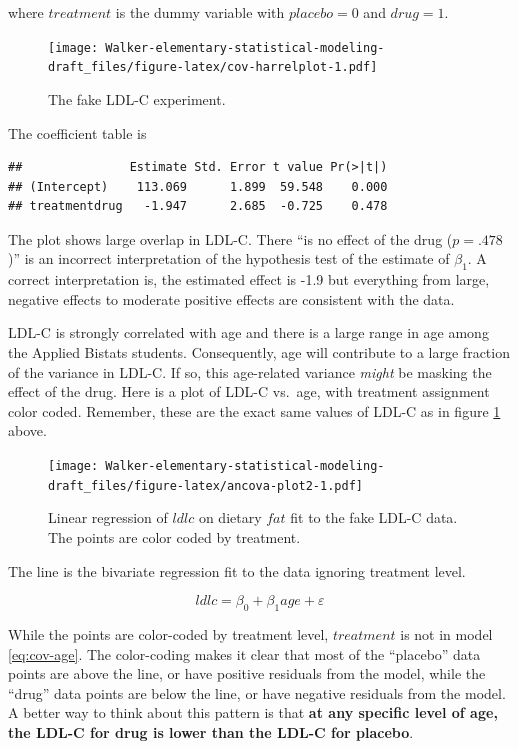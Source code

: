 \documentclass[]{book}
\begin{document}
where \(treatment\) is the dummy variable with \(placebo=0\) and \(drug=1\).

\begin{figure}
\centering
\texttt{[image: Walker-elementary-statistical-modeling-draft\_files/figure-latex/cov-harrelplot-1.pdf]}
\caption{\label{fig:cov-harrelplot}The fake LDL-C experiment.}
\end{figure}

The coefficient table is

\begin{verbatim}
##               Estimate Std. Error t value Pr(>|t|)
## (Intercept)    113.069      1.899  59.548    0.000
## treatmentdrug   -1.947      2.685  -0.725    0.478
\end{verbatim}

The plot shows large overlap in LDL-C. There ``is no effect of the drug (\(p = .478\))'' is an incorrect interpretation of the hypothesis test of the estimate of \(\beta_1\). A correct interpretation is, the estimated effect is -1.9 but everything from large, negative effects to moderate positive effects are consistent with the data.

LDL-C is strongly correlated with age and there is a large range in age among the Applied Bistats students. Consequently, age will contribute to a large fraction of the variance in LDL-C. If so, this age-related variance \emph{might} be masking the effect of the drug. Here is a plot of LDL-C vs.~age, with treatment assignment color coded. Remember, these are the exact same values of LDL-C as in figure \ref{fig:cov-harrelplot} above.

\begin{figure}
\centering
\texttt{[image: Walker-elementary-statistical-modeling-draft\_files/figure-latex/ancova-plot2-1.pdf]}
\caption{\label{fig:ancova-plot2}Linear regression of \(ldlc\) on dietary \(fat\) fit to the fake LDL-C data. The points are color coded by treatment.}
\end{figure}

The line is the bivariate regression fit to the data ignoring treatment level.

\begin{equation}
ldlc = \beta_0 + \beta_1 age + \varepsilon
\label{eq:cov-age}
\end{equation}

While the points are color-coded by treatment level, \(treatment\) is not in model \eqref{eq:cov-age}. The color-coding makes it clear that most of the ``placebo'' data points are above the line, or have positive residuals from the model, while the ``drug'' data points are below the line, or have negative residuals from the model. A better way to think about this pattern is that \textbf{at any specific level of age, the LDL-C for drug is lower than the LDL-C for placebo}.
\end{document}
